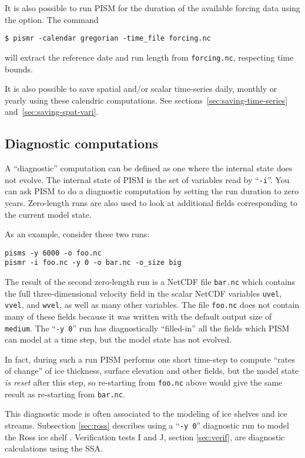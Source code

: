 It is also possible to run PISM for the duration of the available forcing data using the  option.  The command
\begin{verbatim}
$ pismr -calendar gregorian -time_file forcing.nc
\end{verbatim} %
will extract the reference date and run length from \texttt{forcing.nc}, respecting time bounds.

It is also possible to save spatial and/or scalar time-series daily, monthly or yearly using these calendric computations. See sections~\ref{sec:saving-time-series} and~\ref{sec:saving-spat-vari}.


\subsection{Diagnostic computations}
\label{sec:diagnostic-computations}

A ``diagnostic'' computation can be defined as one where the internal state does not evolve.  The internal state of PISM is the set of variables read by ``\texttt{-i}''.  You can ask PISM to do a diagnostic computation by setting the run duration to zero years.  Zero-length runs are also used to look at additional fields corresponding to the current model state.

As an example, consider these two runs:
\begin{verbatim}
pisms -y 6000 -o foo.nc
pismr -i foo.nc -y 0 -o bar.nc -o_size big
\end{verbatim}

\noindent The result of the second zero-length run is a NetCDF file \texttt{bar.nc} which contains the full three-dimensional velocity field in the scalar NetCDF variables \texttt{uvel}, \texttt{vvel}, and \texttt{wvel}, as well as many other variables.  The file \texttt{foo.nc} does not contain many of these fields because it was written with the default output size of \texttt{medium}.  The ``\texttt{-y 0}'' run has diagnostically ``filled-in'' all the fields which PISM can model at a time step, but the model state has not evolved.

In fact, during such a run PISM performs one short time-step to compute ``rates of change'' of ice thickness, surface elevation and other fields, but the model state \emph{is reset} after this step, so re-starting from \texttt{foo.nc} above would give the same result as re-starting from \texttt{bar.nc}.

This diagnostic mode is often associated to the modeling of ice shelves and ice streams.  Subsection \ref{sec:ross} describes using a ``\texttt{-y 0}'' diagnostic run to model the Ross ice shelf \cite{MacAyealetal}.  Verification tests I and J, section \ref{sec:verif}, are diagnostic calculations using the SSA.

